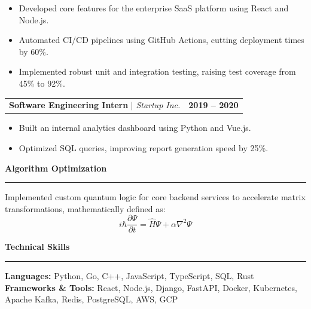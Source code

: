 \documentclass[10pt,a4paper]{article}
\begin{document}
\begin{itemize}[leftmargin=*,noitemsep]
    \item Developed core features for the enterprise SaaS platform using React and Node.js.
    \item Automated CI/CD pipelines using GitHub Actions, cutting deployment times by 60\%.
    \item Implemented robust unit and integration testing, raising test coverage from 45\% to 92\%.
\end{itemize}

\vspace{2mm}
\noindent
\begin{tabularx}{\linewidth}{@{}Xr@{}}
\textbf{Software Engineering Intern} $\vert$ \textit{Startup Inc.} & \textbf{2019 -- 2020} \\
\end{tabularx}

\begin{itemize}[leftmargin=*,noitemsep]
    \item Built an internal analytics dashboard using Python and Vue.js.
    \item Optimized SQL queries, improving report generation speed by 25\%.
\end{itemize}

\vspace{4mm}
\noindent\textbf{\large Algorithm Optimization} \\
\rule{\linewidth}{0.5pt}

Implemented custom quantum logic for core backend services to accelerate matrix transformations, mathematically defined as:
\begin{equation}
i\hbar \frac{\partial \Psi}{\partial t} = \hat{H}\Psi + \alpha \nabla^2 \Psi
\end{equation}

\vspace{4mm}
\noindent\textbf{\large Technical Skills} \\
\rule{\linewidth}{0.5pt}

\textbf{Languages:} Python, Go, C++, JavaScript, TypeScript, SQL, Rust \\
\textbf{Frameworks \& Tools:} React, Node.js, Django, FastAPI, Docker, Kubernetes, Apache Kafka, Redis, PostgreSQL, AWS, GCP
\end{document}
